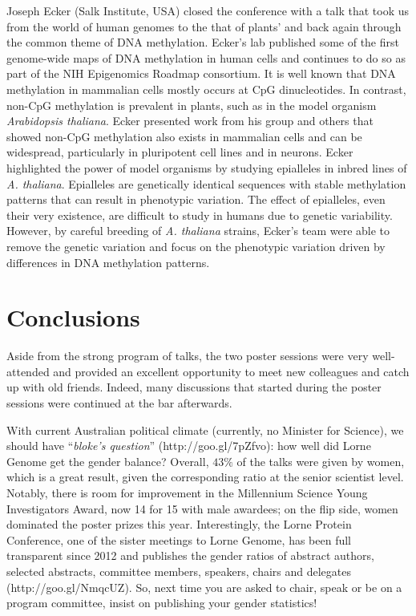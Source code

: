 \documentclass[twocolumn]{bmcart}%
\begin{document}
Joseph Ecker (Salk Institute, USA) closed the conference with a talk that took us from the world of human genomes to the that of plants' and back again through the common theme of DNA methylation. Ecker's lab published some of the first genome-wide maps of DNA methylation in human cells and continues to do so as part of the NIH Epigenomics Roadmap consortium. It is well known that DNA methylation in mammalian cells mostly occurs at CpG dinucleotides.  In contrast, non-CpG methylation is prevalent in plants, such as in the model organism \emph{Arabidopsis thaliana}. Ecker presented work from his group and others that showed non-CpG methylation also exists in mammalian cells and can be widespread, particularly in pluripotent cell lines and in neurons. Ecker highlighted the power of model organisms by studying epialleles in inbred lines of \emph{A. thaliana}. Epialleles are genetically identical sequences with stable methylation patterns that can result in phenotypic variation. The effect of epialleles, even their very existence, are difficult to study in humans due to genetic variability. However, by careful breeding of \emph{A. thaliana} strains, Ecker's team were able to remove the genetic variation and focus on the phenotypic variation driven by differences in DNA methylation patterns.

\section*{Conclusions}
Aside from the strong program of talks, the two poster sessions were very well-attended and provided an excellent opportunity to meet new colleagues and catch up with old friends. Indeed, many discussions that started during the poster sessions were continued at the bar afterwards. 

With current Australian political climate (currently, no Minister for Science), we should have ``{\em bloke's question}'' (http://goo.gl/7pZfvo): how well did Lorne Genome get the gender balance?  Overall, $43\%$ of the talks were given by women, which is a great result, given the corresponding ratio at the senior scientist level.  Notably, there is room for improvement in the Millennium Science Young Investigators Award, now 14 for 15 with male awardees; on the flip side, women dominated the poster prizes this year.  Interestingly, the Lorne Protein Conference, one of the sister meetings to Lorne Genome, has been full transparent since 2012 and publishes the gender ratios of abstract authors, selected abstracts, committee members, speakers, chairs and delegates (http://goo.gl/NmqcUZ).  So, next time you are asked to chair, speak or be on a program committee, insist on publishing your gender statistics!
\end{document}
